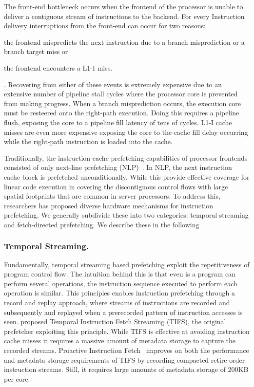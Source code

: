 \documentclass[../main.tex]{subfiles}
\begin{document}
\begin{refsection}
The front-end bottleneck occurs when the frontend of the processor is
unable to deliver a contiguous stream of instructions to the
backend.
For every Instruction delivery interruptions from the front-end can
occur for two reasons: \begin{inparaenum}[1)] \item the frontend
  mispredicts the next instruction due to a branch misprediction or a
  branch target miss or \item the frontend encounters a L1-I
  miss.\end{inparaenum}. Recovering from either of these events is
extremely expensive due to an extensive number of pipeline stall
cycles where the processor core is prevented from making
progress. When a branch misprediction occurs, the execution core must
be resteered onto the right-path execution. Doing this requires a
pipeline flush, exposing the core to a pipeline fill latency of tens
of cycles. L1-I cache misses are even more expensive exposing the core
to the cache fill delay occurring while the right-path instruction is
loaded into the cache.

Traditionally, the instruction cache prefetching capabilities of
processor frontends consisted of only next-line prefetching
(NLP)~\cite{nextline_pref}. In NLP, the next instruction cache block
is prefetched unconditionally. While this provide effective coverage
for linear code execution in covering the discontiguous control flows
with large spatial footprints that are common in server processors. To
address this, researchers has proposed diverse hardware mechanisms for
instruction prefetching. We generally subdivide these into two
categories: temporal streaming and fetch-directed prefetching. We describe these in the following

\subsubsection{Temporal Streaming.} Fundamentally, temporal streaming
based prefetching exploit the repetitiveness of program control
flow. The intuition behind this is that even is a program can perform
several operations, the instruction sequence executed to perform each
operation is similar. This principles enables instruction prefetching
through a record and replay approach, where streams of instructions
are recorded and subsequently and replayed when a prerecorded pattern
of instruction accesses is seen. \textcite{ferdman08_tempor} proposed
Temporal Instruction Fetch Streaming (TIFS), the original prefetcher
exploiting this principle. While TIFS is effective at avoiding
instruction cache misses it requires a massive amount of metadata
storage to capture the recorded streams.  Proactive Instruction
Fetch~\cite{ferdman11_proac_instr_fetch} improves on both the performance and metadata storage requirements of TIFS by recording compacted retire-order instruction streams. Still, it requires large amounts of metadata storage of 200KB per core.


\end{refsection}
\end{document}
